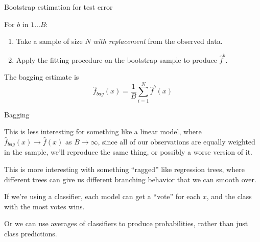 \documentclass[xcolor={table}, handout]{beamer}
\begin{document}

\begin{frame}{Bootstrap estimation for test error}

\begin{wideitemize}
\item For $b$ in $1\dots B$:\pause
\begin{enumerate}

    \item Take a sample of size $N$  \textit{with replacement} from the observed data. \pause

    \item Apply the fitting procedure on the bootstrap sample to produce $\hat f^b$.
    \end{enumerate}
\pause
\item The bagging estimate is 
\[
\hat f_{bag}(x) = \frac{1}{B}\sum_{i = 1}^N \hat f^b(x)
\]
\end{wideitemize}

\end{frame}





\begin{frame}{Bagging}

\begin{wideitemize}
\item This is less interesting for something like a linear model, where $\hat f_{bag}(x) \to \hat f(x)$ as $B \to \infty$, since all of our observations are equally weighted in the sample, we'll reproduce the same thing\pause, or possibly a worse version of it. \pause
\item This is more interesting with something ``ragged'' like regression trees, where different trees can give us different branching behavior that we can smooth over. \pause 
\item If we're using a classifier, each model can get a ``vote'' for each $x$, and the class with the most votes wins. \pause
\item Or we can use averages of classifiers to produce probabilities, rather than just class predictions. 
\end{wideitemize}

\end{frame}
\end{document}
